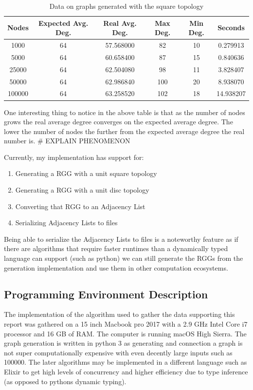 \documentclass{article}
\begin{document}
	\begin{center}
	  \begin{table}[H]
			\begin{tabular}{ |c|c|c|c|c|c| }
				\hline
				Nodes & Expected Avg. Deg. & Real Avg. Deg. & Max Deg. & Min Deg. & Seconds \\
				\hline
				1000 & 64 & 57.568000 & 82 & 10 & 0.279913 \\
				\hline
				5000 & 64 & 60.658400 & 87 & 15 & 0.840636 \\
				\hline
				25000 & 64 & 62.504080 & 98 & 11 & 3.828407 \\
				\hline
				50000 & 64 & 62.986840 & 100 & 20 & 8.938070 \\
				\hline
				100000 & 64 & 63.258520 & 102 & 18 & 14.938207 \\
				\hline
			\end{tabular}
			\caption{Data on graphs generated with the square topology}
		\end{table}
	\end{center}
	One interesting thing to notice in the above table is that as the number of nodes grows the real average degree converges on the expected average degree.
	The lower the number of nodes the further from the expected average degree the real number is.
	# EXPLAIN PHENOMENON
	
  Currently, my implementation has support for:
  \begin{enumerate}
		\item Generating a RGG with a unit square topology
		\item Generating a RGG with a unit disc topology
		\item Converting that RGG to an Adjacency List
		\item Serializing Adjacency Lists to files
  \end{enumerate}
  Being able to serialize the Adjacency Lists to files is a noteworthy feature as if there are algorithms that require faster runtimes than a dynamically typed language can support (such as python) we can still generate the RGGs from the generation implementation  and use them in other computation ecosystems.

  \subsection{Programming Environment Description}
		The implementation of the algorithm used to gather the data supporting this report was gathered on a 15 inch Macbook pro 2017 with a 2.9 GHz Intel Core i7 processor and 16 GB of RAM.
		The computer is running macOS High Sierra.
		The graph generation is written in python 3 as generating and connection a graph is not super computationally expensive with even decently large inputs such as 100000.
		The later algorithms may be implemented in a different language such as Elixir to get high levels of concurrency and higher efficiency due to type inference (as opposed to pythons dynamic typing).
\end{document}

